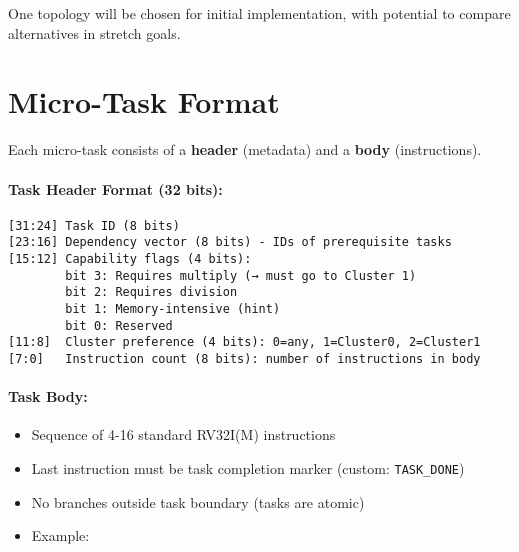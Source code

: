 \documentclass[a4paper,12pt]{article}
\begin{document}
\vspace{0.3cm}
\begin{tcolorbox}[
  colback=lightblue!20,
  colframe=accentblue,
  arc=2mm,
  boxrule=1pt,
  left=8pt,
  right=8pt,
  top=5pt,
  bottom=5pt
]

One topology will be chosen for initial implementation, with potential to compare alternatives in stretch goals.
\end{tcolorbox}


\section*{Micro-Task Format}

Each micro-task consists of a \textbf{header} (metadata) and a \textbf{body} (instructions).

\paragraph{Task Header Format (32 bits):}
\begin{verbatim}
[31:24] Task ID (8 bits)
[23:16] Dependency vector (8 bits) - IDs of prerequisite tasks
[15:12] Capability flags (4 bits):
        bit 3: Requires multiply (→ must go to Cluster 1)
        bit 2: Requires division
        bit 1: Memory-intensive (hint)
        bit 0: Reserved
[11:8]  Cluster preference (4 bits): 0=any, 1=Cluster0, 2=Cluster1
[7:0]   Instruction count (8 bits): number of instructions in body
\end{verbatim}

\paragraph{Task Body:} 
\begin{itemize}
    \item Sequence of 4-16 standard RV32I(M) instructions
    \item Last instruction must be task completion marker (custom: \texttt{TASK\_DONE})
    \item No branches outside task boundary (tasks are atomic)
    \item Example:
\end{itemize}
\end{document}
